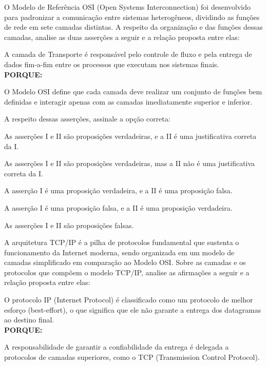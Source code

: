 \documentclass[11pt, addpoints]{modelo/prova2}
\begin{document}
\question[0.5] O Modelo de Referência OSI (Open Systems Interconnection) foi desenvolvido para padronizar a comunicação entre sistemas heterogêneos, dividindo as funções de rede em sete camadas distintas. A respeito da organização e das funções dessas camadas, analise as duas asserções a seguir e a relação proposta entre elas:
    \begin{statements}
        \item A camada de Transporte é responsável pelo controle de fluxo e pela entrega de dados fim-a-fim entre os processos que executam nos sistemas finais.\\[0.7em]
        \textbf{PORQUE:}\vspace{0.5em}
        \item O Modelo OSI define que cada camada deve realizar um conjunto de funções bem definidas e interagir apenas com as camadas imediatamente superior e inferior.
    \end{statements}
    A respeito dessas asserções, assinale a opção correta:
    \begin{choices}
        \item As asserções I e II são proposições verdadeiras, e a II é uma justificativa correta da I.
        \item As asserções I e II são proposições verdadeiras, mas a II não é uma justificativa correta da I.
        \item A asserção I é uma proposição verdadeira, e a II é uma proposição falsa.
        \item A asserção I é uma proposição falsa, e a II é uma proposição verdadeira.
        \item As asserções I e II são proposições falsas.
    \end{choices} 
\question[0.5] A arquitetura TCP/IP é a pilha de protocolos fundamental que sustenta o funcionamento da Internet moderna, sendo organizada em um modelo de camadas simplificado em comparação ao Modelo OSI. Sobre as camadas e os protocolos que compõem o modelo TCP/IP, analise as afirmações a seguir e a relação proposta entre elas:
    \begin{statements}
        \item O protocolo IP (Internet Protocol) é classificado como um protocolo de melhor esforço (best-effort), o que significa que ele não garante a entrega dos datagramas ao destino final.\\[0.7em]
        \textbf{PORQUE:} \vspace{0.5em}
        \item A responsabilidade de garantir a confiabilidade da entrega é delegada a protocolos de camadas superiores, como o TCP (Transmission Control Protocol).
    \end{statements}
\end{document}
